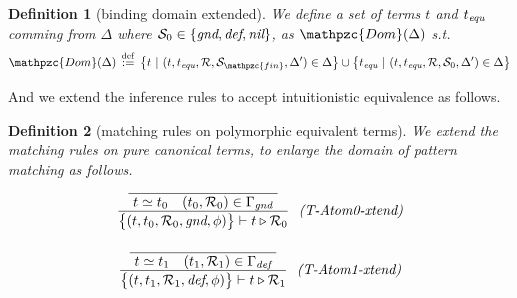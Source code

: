 \documentclass[12pt]{article}
\newtheorem{Definition}{Definition}[section]
\begin{document}
\begin{Definition}[binding domain extended]
  We define a set of terms $t$ and $t_{\text{\it equ}}$ comming from
  $\Delta$ where $\mathcal{S}_0 \in \{\text{\it gnd}, \text{\it def},
  \text{\it nil}\}$, as $\mathpzc{Dom}(\Delta)$ s.t.
  \[ \mathpzc{Dom}(\Delta) \,\stackrel{\mathrm{def}}{:=}\,
  \bigl\{ t \ |\  (t, t_{\text{\it equ}}, \mathcal{R},
  \mathcal{S}_{\mathpzc{fin}}, \Delta') \in \Delta \bigr\} \cup
  \bigl\{t_{\text{\it equ}}  \ |\  (t, t_{\text{\it equ}},
  \mathcal{R}, \mathcal{S}_0, \Delta') \in \Delta \bigr\} 
  \]
\end{Definition}


And we extend the inference rules to accept intuitionistic equivalence
as follows.

\begin{Definition}[matching rules on polymorphic equivalent terms]
  We extend the matching rules on pure canonical terms, to
  enlarge the domain of pattern matching as follows. 
  \begin{displaymath}
    \begin{array}{c}

      \begin{array}{rl}
        \dfrac{
          \dfrac{}{
            \raisebox{0.5ex}[2.3ex][0ex]{
              $t \simeq t_0
                \quad (t_0, \mathcal{R}_0) \in \Gamma_\text{\it gnd}$
            }
          }
        }{
          \bigl\{(t, t_0, \mathcal{R}_0, \text{\it gnd}, \phi ) \bigr\}
           \vdash t \triangleright \mathcal{R}_0          
        }  &  \!\! \text{\it (T-Atom0-xtend)}
      \end{array}  \\
      \\
      
      \begin{array}{rl}
        \dfrac{
          \dfrac{}{
            \raisebox{0.5ex}[2.3ex][0ex]{
              $t \simeq t_1
                \quad (t_1, \mathcal{R}_1) \in \Gamma_\text{\it def}$
            }
          }
        }{
          \bigl\{(t, t_1, \mathcal{R}_1, \text{\it def}, \phi ) \bigr\}
           \vdash t \triangleright \mathcal{R}_1
        }  &  \!\! \text{\it (T-Atom1-xtend)}
      \end{array}  \\
      \\
      

\end{array}
\end{displaymath}
\end{Definition}
\end{document}
